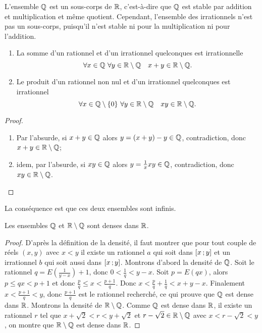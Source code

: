 L'ensemble \(\mathbb{Q}\) est un sous-corps de \(\mathbb{R}\), c'est-à-dire que \(\mathbb{Q}\) est
stable par addition et multiplication et même quotient. Cependant, l'ensemble
des irrationnels n'est pas un sous-corps, puisqu'il n'est stable ni pour la
multiplication ni pour l'addition.

\begin{prop}
  \begin{enumerate}
    \item La somme d'un rationnel et d'un irrationnel quelconques est
      irrationnelle
      \begin{equation}
        \forall x \in \mathbb{Q} \ \forall y \in \mathbb{R}\setminus\mathbb{Q} \quad x + y \in
        \mathbb{R}\setminus\mathbb{Q}.
      \end{equation}
    \item Le produit d'un rationnel non nul et d'un irrationnel quelconques est
      irrationnel
      \begin{equation}
        \forall x \in \mathbb{Q}\setminus\{0\} \ \forall y \in \mathbb{R}\setminus\mathbb{Q} \quad xy
        \in \mathbb{R}\setminus\mathbb{Q}.
      \end{equation}
  \end{enumerate}
\end{prop}

\begin{proof}
  \begin{enumerate}
    \item Par l'absurde, si \(x + y\in\mathbb{Q}\) alors \(y = (x + y) - y \in \mathbb{Q}\),
      contradiction, donc \(x + y\in\mathbb{R}\setminus\mathbb{Q}\);
    \item idem, par l'absurde, si \(xy\in \mathbb{Q}\) alors \(y = \frac{1}{x}xy\in\mathbb{Q}\),
      contradiction, donc \(xy\in\mathbb{R}\setminus\mathbb{Q}\).
  \end{enumerate}
\end{proof}

La conséquence est que ces deux ensembles sont infinis.

\begin{theo}
  Les ensembles \(\mathbb{Q}\) et \(\mathbb{R}\setminus\mathbb{Q}\) sont denses dans \(\mathbb{R}\).
\end{theo}

\begin{proof}
  D'après la définition de la densité, il faut montrer que pour tout couple de
  réels \((x, y)\) avec \(x<y\) il existe un rationnel \(a\) qui soit dans
  \(\left[ x \, ; {} y \right]\) et un irrationnel \(b\) qui soit aussi dans
  \(\left[ x \, ; {} y \right]\). Montrons d'abord la densité de \(\mathbb{Q}\). Soit le
  rationnel \(q = E\left(\frac{1}{y - x}\right) + 1\), donc \(0<\frac{1}{q}<y -
  x\).  Soit \(p = E(qx)\), alors \(p\leqslant qx<p + 1\) et donc
  \(\frac{p}{q}\leqslant x <\frac{p + 1}{q}\). Donc \(x<\frac{p}{q} +
  \frac{1}{q}<x + y - x\). Finalement \(x<\frac{p + 1}{q}<y\), donc \(\frac{p +
  1}{q}\) est le rationnel recherché, ce qui prouve que \(\mathbb{Q}\) est dense dans
  \(\mathbb{R}\). Montrons la densité de \(\mathbb{R}\setminus\mathbb{Q}\). Comme \(\mathbb{Q}\) est dense dans
  \(\mathbb{R}\), il existe un rationnel \(r\) tel que \(x + \sqrt{2}<r<y + \sqrt{2}\)
  et \(r - \sqrt{2}\in\mathbb{R}\setminus\mathbb{Q}\) avec \(x<r - \sqrt{2}<y\), on montre que
  \(\mathbb{R}\setminus\mathbb{Q}\) est dense dans \(\mathbb{R}\).
\end{proof}

